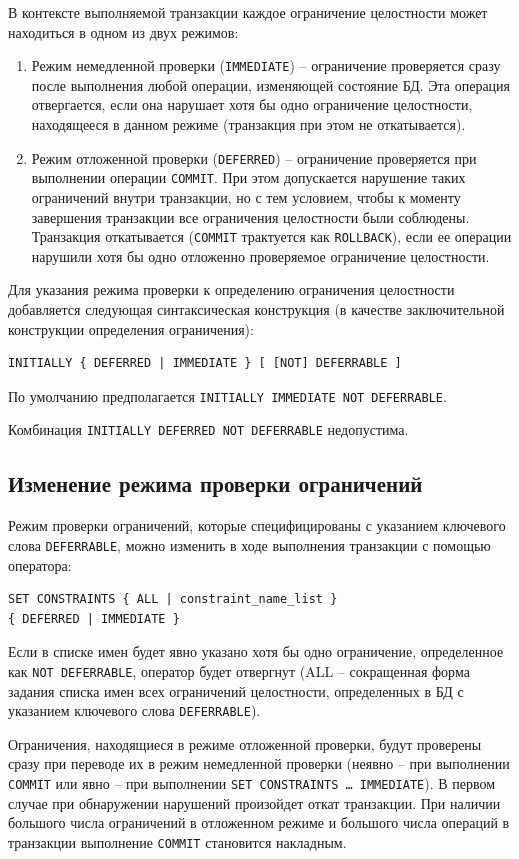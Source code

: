 \documentclass[a4paper,12pt]{article}
\begin{document}
В контексте выполняемой транзакции каждое ограничение целостности может находиться в одном из двух режимов:
\begin{enumerate}
    \item Режим немедленной проверки (\texttt{IMMEDIATE}) – ограничение проверяется сразу после выполнения любой операции, изменяющей состояние БД. Эта операция отвергается, если она нарушает хотя бы одно ограничение целостности, находящееся в данном режиме (транзакция при этом не откатывается).
    \item Режим отложенной проверки (\texttt{DEFERRED}) – ограничение проверяется при выполнении операции \texttt{COMMIT}. При этом допускается нарушение таких ограничений внутри транзакции, но с тем условием, чтобы к моменту завершения транзакции все ограничения целостности были соблюдены. Транзакция откатывается (\texttt{COMMIT} трактуется как \texttt{ROLLBACK}), если ее операции нарушили хотя бы одно отложенно проверяемое ограничение целостности.
\end{enumerate}

Для указания режима проверки к определению ограничения целостности добавляется следующая синтаксическая конструкция (в качестве заключительной конструкции определения ограничения):
\begin{verbatim}
INITIALLY { DEFERRED | IMMEDIATE } [ [NOT] DEFERRABLE ]
\end{verbatim}
По умолчанию предполагается \texttt{INITIALLY IMMEDIATE NOT DEFERRABLE}.

Комбинация \texttt{INITIALLY DEFERRED NOT DEFERRABLE} недопустима.

\subsection{Изменение режима проверки ограничений}

Режим проверки ограничений, которые специфицированы с указанием ключевого слова \texttt{DEFERRABLE}, можно изменить в ходе выполнения транзакции с помощью оператора:
\begin{verbatim}
SET CONSTRAINTS { ALL | constraint_name_list } 
{ DEFERRED | IMMEDIATE }
\end{verbatim}
Если в списке имен будет явно указано хотя бы одно ограничение, определенное как \texttt{NOT DEFERRABLE}, оператор будет отвергнут (ALL – сокращенная форма задания списка имен всех ограничений целостности, определенных в БД с указанием ключевого слова \texttt{DEFERRABLE}).

Ограничения, находящиеся в режиме отложенной проверки, будут проверены сразу при переводе их в режим немедленной проверки (неявно – при выполнении \texttt{COMMIT} или явно – при выполнении \texttt{SET CONSTRAINTS … IMMEDIATE}). В первом случае при обнаружении нарушений произойдет откат транзакции. При наличии большого числа ограничений в отложенном режиме и большого числа операций в транзакции выполнение \texttt{COMMIT} становится накладным.
\end{document}

